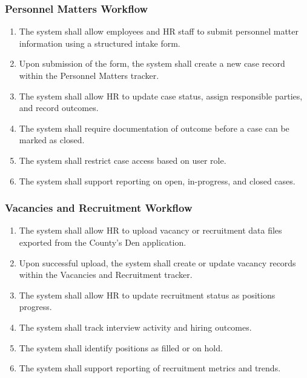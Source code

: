 \documentclass[12pt]{article}
\begin{document}
\subsubsection{Personnel Matters Workflow}

\begin{enumerate}
    \item The system shall allow employees and HR staff to submit personnel matter information using a structured intake form.
    
    \item Upon submission of the form, the system shall create a new case record within the Personnel Matters tracker.
    
    \item The system shall allow HR to update case status, assign responsible parties, and record outcomes.
    
    \item The system shall require documentation of outcome before a case can be marked as closed.
    
    \item The system shall restrict case access based on user role.
    
    \item The system shall support reporting on open, in-progress, and closed cases.
\end{enumerate}

\subsubsection{Vacancies and Recruitment Workflow}

\begin{enumerate}
    \item The system shall allow HR to upload vacancy or recruitment data files exported from the County’s Den application.
    
    \item Upon successful upload, the system shall create or update vacancy records within the Vacancies and Recruitment tracker.
    
    \item The system shall allow HR to update recruitment status as positions progress.
    
    \item The system shall track interview activity and hiring outcomes.
    
    \item The system shall identify positions as filled or on hold.
    
    \item The system shall support reporting of recruitment metrics and trends.
\end{enumerate}
\end{document}
